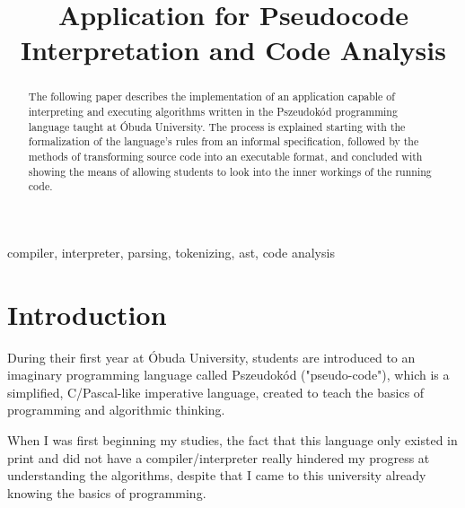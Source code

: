 \documentclass[conference]{IEEEtran}
\begin{document}
\title{Application for Pseudocode Interpretation and Code Analysis}

\author{
\and
{}
}

\maketitle

\begin{abstract}
The following paper describes the implementation of an application capable of interpreting and executing algorithms written in the Pszeudokód programming language taught at Óbuda University. The process is explained starting with the formalization of the language's rules from an informal specification, followed by the methods of transforming source code into an executable format, and concluded with showing the means of allowing students to look into the inner workings of the running code.
\end{abstract}

\begin{IEEEkeywords}
compiler, interpreter, parsing, tokenizing, ast, code analysis
\end{IEEEkeywords}

\section{Introduction}

During their first year at Óbuda University, students are introduced to an imaginary programming language called Pszeudokód ("pseudo-code"), which is a simplified, C/Pascal-like imperative language, created to teach the basics of programming and algorithmic thinking.

When I was first beginning my studies, the fact that this language only existed in print and did not have a compiler/interpreter really hindered my progress at understanding the algorithms, despite that I came to this university already knowing the basics of programming.
\end{document}
